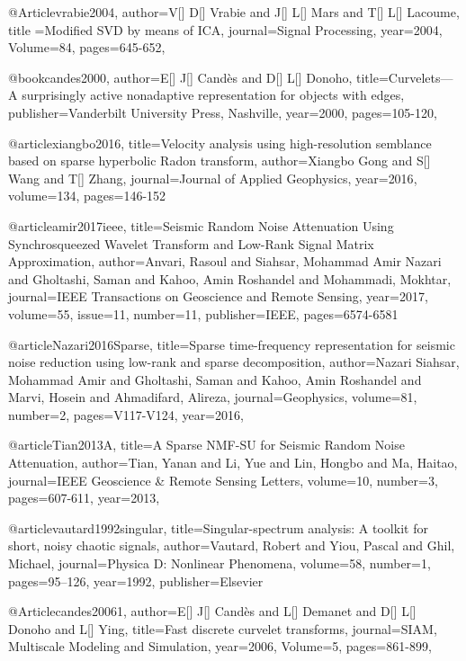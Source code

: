@Article{vrabie2004,
  author={V[] D[] Vrabie and J[] L[] Mars and T[] L[] Lacoume},
  title ={Modified SVD by means of ICA},
  journal={Signal Processing},
  year=2004,
  Volume=84,
  pages={645-652},
}

@book{candes2000,
  author={E[] J[] Cand\`{e}s and D[] L[] Donoho},
  title={Curvelets—A surprisingly active nonadaptive representation for objects with edges},
  publisher={Vanderbilt University Press, Nashville},
  year=2000,
    pages={105-120},
}



@article{xiangbo2016,
  title={Velocity analysis using high-resolution semblance based on sparse hyperbolic Radon transform},
  author={Xiangbo Gong and S[] Wang and T[] Zhang},
  journal={Journal of Applied Geophysics},
  year={2016},
  volume=134,
  pages={146-152}
}



@article{amir2017ieee,
  title={Seismic Random Noise Attenuation Using Synchrosqueezed Wavelet Transform and Low-Rank Signal Matrix Approximation},
  author={Anvari, Rasoul and Siahsar, Mohammad Amir Nazari and Gholtashi, Saman and Kahoo, Amin Roshandel and Mohammadi, Mokhtar},
  journal={IEEE Transactions on Geoscience and Remote Sensing},
  year={2017},
  volume=55,
  issue=11,
  number=11,
  publisher={IEEE},
  pages={6574-6581}
}

@article{Nazari2016Sparse,
  title={Sparse time-frequency representation for seismic noise reduction using low-rank and sparse decomposition},
  author={Nazari Siahsar, Mohammad Amir and Gholtashi, Saman and Kahoo, Amin Roshandel and Marvi, Hosein and Ahmadifard, Alireza},
  journal={Geophysics},
  volume={81},
  number={2},
  pages={V117-V124},
  year={2016},
}

@article{Tian2013A,
  title={A Sparse NMF-SU for Seismic Random Noise Attenuation},
  author={Tian, Yanan and Li, Yue and Lin, Hongbo and Ma, Haitao},
  journal={IEEE Geoscience \& Remote Sensing Letters},
  volume={10},
  number={3},
  pages={607-611},
  year={2013},
}


@article{vautard1992singular,
  title={Singular-spectrum analysis: A toolkit for short, noisy chaotic signals},
  author={Vautard, Robert and Yiou, Pascal and Ghil, Michael},
  journal={Physica D: Nonlinear Phenomena},
  volume={58},
  number={1},
  pages={95--126},
  year={1992},
  publisher={Elsevier}
}


@Article{candes20061,
  author={E[] J[] Cand\`{e}s and L[] Demanet and D[] L[] Donoho and L[] Ying},
  title={Fast discrete curvelet transforms},
  journal={SIAM, Multiscale Modeling and Simulation},
  year=2006,
  Volume=5,
  pages={861-899},
}

